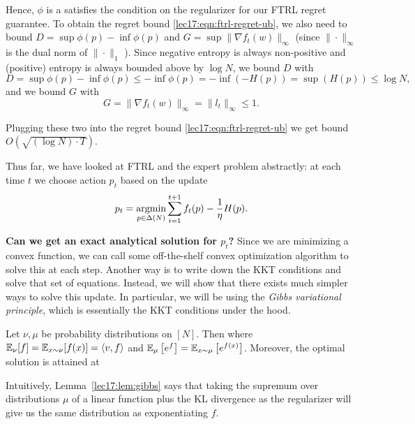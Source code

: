 Hence, $\phi$ is a satisfies the condition on the regularizer for our FTRL regret guarantee. To obtain the regret bound \eqref{lec17:eqn:ftrl-regret-ub}, we also need to bound $D = \sup \phi(p) - \inf \phi(p)$ and $G = \sup \|\nabla f_t(w)\|_\infty$ (since $\|\cdot\|_\infty$ is the dual norm of $\|\cdot \|_1$ ). Since negative entropy is always non-positive and (positive) entropy is always bounded above by $\log N$, we bound $D$ with
\begin{equation} 
D = \sup \phi(p) - \inf \phi(p) \leq -\inf \phi (p) = -\inf (-H(p)) = \sup (H(p)) \leq \log N,
\end{equation}
and we bound $G$ with
\begin{equation}
G = \|\nabla f_t(w)\|_\infty = \|l_t\|_\infty \leq 1.
\end{equation}

Plugging these two into the regret bound \eqref{lec17:eqn:ftrl-regret-ub} we get bound $O(\sqrt{(\log N) \cdot T})$. 

Thus far, we have looked at FTRL and the expert problem abstractly: at each time $t$ we choose action $p_t$ based on the update
\begin{equation}
p_t = \operatorname*{\textup{argmin}}_{p \in \Delta(N)} \sum_{i=1}^{t+1} f_t(p) - \frac{1}{\eta} H(p).
\end{equation}

\textbf{Can we get an exact analytical solution for $p_t$?} Since we are minimizing a convex function, we can call some off-the-shelf convex optimization algorithm to solve this at each step. Another way is to write down the KKT conditions and solve that set of equations.  Instead, we will show that there exists much simpler ways to solve this update. In particular, we will be using the \textit{Gibbs variational principle}, which is essentially the KKT conditions under the hood.

\begin{lemma} \label{lec17:lem:gibbs}
Let $\nu, \mu$ be probability distributions on $[N]$. Then 
 where $\operatorname*{\mathbb{E}}_\nu[f] = \operatorname*{\mathbb{E}}_{x \sim \nu} [f(x)] = \langle v, f\rangle$ and $\operatorname*{\mathbb{E}}_\mu \left[e^f\right] = \operatorname*{\mathbb{E}}_{x \sim \mu}  \left[e^{f(x)}\right]$. Moreover, the optimal solution is attained at 
\end{lemma}

Intuitively, Lemma~\ref{lec17:lem:gibbs} says that taking the supremum over distributions $\mu$ of a linear function plus the KL divergence as the regularizer will give us the same distribution as exponentiating $f$. 

